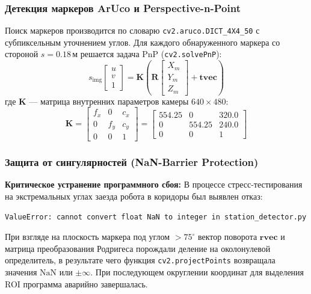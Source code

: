 \documentclass[a4paper,11pt]{article}
\begin{document}
\subsubsection{Детекция маркеров ArUco и Perspective-n-Point}
Поиск маркеров производится по словарю \texttt{cv2.aruco.DICT\_4X4\_50} с субпиксельным уточнением углов. Для каждого обнаруженного маркера со стороной $s = 0.18$\,м решается задача PnP (\texttt{cv2.solvePnP}):
\begin{equation}
s_{\text{img}} \begin{bmatrix} u \\ v \\ 1 \end{bmatrix} = \mathbf{K} \left( \mathbf{R} \begin{bmatrix} X_m \\ Y_m \\ Z_m \end{bmatrix} + \mathbf{tvec} \right)
\end{equation}
где $\mathbf{K}$ — матрица внутренних параметров камеры $640 \times 480$:
\begin{equation}
\mathbf{K} = \begin{bmatrix} f_x & 0 & c_x \\ 0 & f_y & c_y \\ 0 & 0 & 1 \end{bmatrix} = \begin{bmatrix} 554.25 & 0 & 320.0 \\ 0 & 554.25 & 240.0 \\ 0 & 0 & 1 \end{bmatrix}
\end{equation}

\subsubsection{Защита от сингулярностей (NaN-Barrier Protection)}
\textbf{Критическое устранение программного сбоя:} В процессе стресс-тестирования на экстремальных углах заезда робота в коридоры был выявлен отказ:
\begin{lstlisting}[language=bash]
ValueError: cannot convert float NaN to integer in station_detector.py
\end{lstlisting}
При взгляде на плоскость маркера под углом $> 75^\circ$ вектор поворота $\mathbf{rvec}$ и матрица преобразования Родригеса порождали деление на околонулевой определитель, в результате чего функция \texttt{cv2.projectPoints} возвращала значения $\text{NaN}$ или $\pm \infty$. При последующем округлении координат для выделения ROI программа аварийно завершалась.
\end{document}
